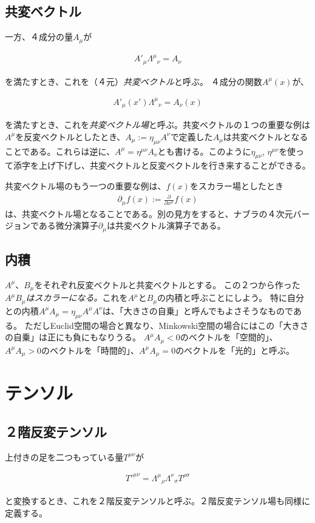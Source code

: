 \documentclass[report,paper=a4, fontsize=12pt, line_length=16cm, number_of_lines=33,dvipdfmx]{jlreq}
\newenvironment{important}{\begin{tcolorbox}[
  colback = white,
  colframe = red!35,
  boxrule = 2mm,
  fonttitle = \bfseries,
  after = \noindent] }{\end{tcolorbox}}
\numberwithin{equation}{chapter}
\newcommand{\del}{\partial}
\begin{document}
\subsection{共変ベクトル}
一方、４成分の量$A_{\mu}$が
\begin{important}
\begin{align}
A'_{\mu}\Lambda^{\mu}{}_{\nu}=A_{\nu}
\end{align}
\end{important}
を満たすとき、これを（４元）\emph{共変ベクトル}と呼ぶ。
４成分の関数$A^{\mu}(x)$が、
\begin{important}
\begin{align}
A'_{\mu}(x')\Lambda^{\mu}{}_{\nu}=A_{\nu}(x)
\end{align}
\end{important}
を満たすとき、これを\emph{共変ベクトル場}と呼ぶ。共変ベクトルの１つの重要な例は$A^{\mu}$を反変ベクトルとしたとき、$A_{\mu}:=\eta_{\mu\nu}A^{\nu}$で定義した$A_{\mu}$は共変ベクトルとなることである。これらは逆に、$A^{\mu}=\eta^{\mu\nu}A_{\nu}$とも書ける。このように$\eta_{\mu\nu}$, $\eta^{\mu\nu}$を使って添字を上げ下げし、共変ベクトルと反変ベクトルを行き来することができる。

共変ベクトル場のもう一つの重要な例は、$f(x)$をスカラー場としたとき
\begin{align}
\del_{\mu}f(x):=\frac{\del}{\del x^{\mu}} f(x)
\end{align}
は、共変ベクトル場となることである。別の見方をすると、ナブラの４次元バージョンである微分演算子$\del_{\mu}$は共変ベクトル演算子である。

\subsection{内積}
$A^{\mu}$、$B_{\mu}$をそれぞれ反変ベクトルと共変ベクトルとする。
この２つから作った\emph{$A^{\mu}B_{\mu}$はスカラーになる。}これを$A^{\mu}$と$B_{\mu}$の内積と呼ぶことにしよう。
特に自分との内積$A^{\mu}A_{\mu}=\eta_{\mu\nu}A^{\mu}A^{\nu}$は、「大きさの自乗」と呼んでもよさそうなものである。
ただしEuclid空間の場合と異なり、Minkowski空間の場合にはこの「大きさの自乗」は正にも負にもなりうる。
$A^{\mu}A_{\mu}<0$のベクトルを「空間的」、$A^{\mu}A_{\mu}>0$のベクトルを「時間的」、$A^{\mu}A_{\mu}=0$のベクトルを「光的」と呼ぶ。

\section{テンソル}
\subsection{２階反変テンソル}
上付きの足を二つもっている量$T^{\mu\nu}$が
\begin{important}
\begin{align}
 T'^{\mu\nu}=\Lambda^{\mu}{}_{\rho}\Lambda^{\nu}{}_{\sigma}T^{\rho\sigma}
\end{align}
\end{important}
と変換するとき、これを２階反変テンソルと呼ぶ。２階反変テンソル場も同様に定義する。
\end{document}
